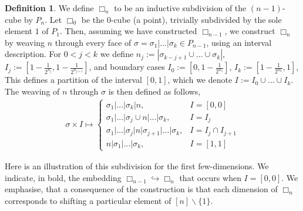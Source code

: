 \documentclass{amsart}
\newcommand{\darkblue}{\color{darkblue}} %
\theoremstyle{definition}
\newtheorem{definition}[theorem]{Definition}
\newcommand{\ssm}{\smallsetminus} %
\newcommand{\defn}[1]{\textsl{\darkblue #1}} %
\newcommand{\divcube}[1]{\Box_{#1}}
\begin{document}
\begin{definition}
We define \defn{$\divcube{n}$} to be an inductive subdivision of the $(n-1)$-cube by $P_n$.
Let $\divcube{0}$ be the $0$-cube (a point), trivially subdivided by the sole element $1$ of $P_1$.
Then, assuming we have constructed $\divcube{n-1}$, we construct $\divcube{n}$ by weaving $n$ through every face of $\sigma = \sigma_1|...|\sigma_k \in P_{n-1}$, using an interval description.
For $0<j<k$ we define
$n_j := |\sigma_{k-j+1}\cup...\cup \sigma_k|$, $I_j := [1 - \frac{1}{2^{n_j}}, 1 - \frac{1}{2^{n_{j+1}}}]$, and boundary cases $I_0:= [0,1 - \frac{1}{2^{n_1}}]$, $I_k:= [1 - \frac{1}{2^{n_k}},1]$,
This defines a partition of the interval $[0,1]$, which we denote $I := I_0 \cup ... \cup I_k$.
The weaving of $n$ through $\sigma$ is then defined as follows,
\begin{align} \label{eq:SU cube inductive def}
	\sigma \times I \mapsto 
	\begin{cases}
		\sigma_1|...|\sigma_k| n, &I = [0, 0]\\
		\sigma_1|...|\sigma_j \cup n|...|\sigma_k, &I = I_j\\
		\sigma_1|...|\sigma_j|n|\sigma_{j+1}|...|\sigma_k, &I = I_j \cap I_{j+1}\\
		n|\sigma_1|...|\sigma_k, &I = [1, 1]
	\end{cases}
\end{align}
\end{definition}

Here is an illustration of this subdivision for the first few-dimensions.
We indicate, in bold, the embedding $\divcube{n-1}\hookrightarrow \divcube{n}$ that occurs when $I=[0, 0]$. 
We emphasise, that a consequence of the construction is that each dimension of $\divcube{n}$ corresponds to shifting a particular element of $[n]\ssm \{1\}$.
\end{document}
